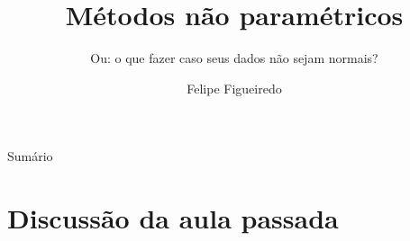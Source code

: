 \documentclass{beamer}
\title%
{Métodos não paramétricos}
\subtitle
{Ou: o que fazer caso seus dados não sejam normais?} %
\author%
{Felipe Figueiredo}%
\institute[INTO] %
{Instituto Nacional de Traumatologia e Ortopedia
}
\date%
{}
\begin{document}
\begin{frame}
  \titlepage
\end{frame}

\begin{frame}{Sumário}
  \tableofcontents
\end{frame}








\section{Discussão da aula passada}
\end{document}
